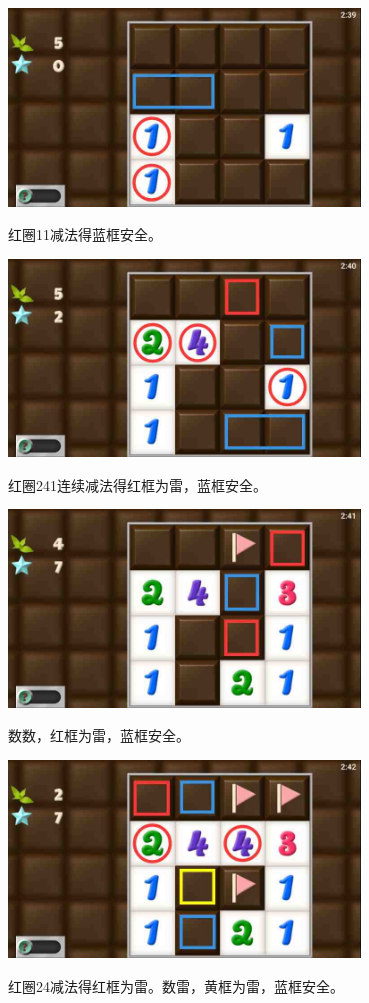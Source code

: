 \subsection{} %
\begin{center}
    \includegraphics[width=0.7\textwidth]{puzzlelow/32-1.jpg}
\end{center}
红圈11减法得蓝框安全。
\begin{center}
    \includegraphics[width=0.7\textwidth]{puzzlelow/32-2.jpg}
\end{center}
红圈241连续减法得红框为雷，蓝框安全。
\begin{center}
    \includegraphics[width=0.7\textwidth]{puzzlelow/32-3.jpg}
\end{center}
数数，红框为雷，蓝框安全。
\begin{center}
    \includegraphics[width=0.7\textwidth]{puzzlelow/32-4.jpg}
\end{center}
红圈24减法得红框为雷。数雷，黄框为雷，蓝框安全。

